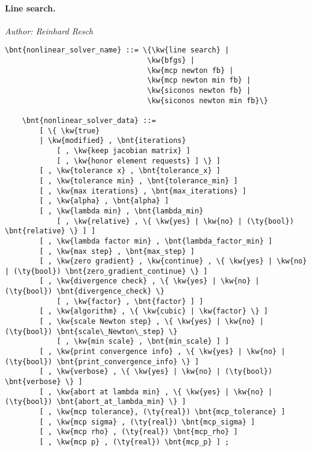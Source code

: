 \paragraph{Line search.}
\emph{Author: Reinhard Resch}
\begin{Verbatim}[commandchars=\\\{\}]
    \bnt{nonlinear_solver_name} ::= \{\kw{line search} |
                                 \kw{bfgs} |
                                 \kw{mcp newton fb} |
                                 \kw{mcp newton min fb} |
                                 \kw{siconos newton fb} |
                                 \kw{siconos newton min fb}\}

    \bnt{nonlinear_solver_data} ::= 
        [ \{ \kw{true}
        | \kw{modified} , \bnt{iterations}
            [ , \kw{keep jacobian matrix} ]
            [ , \kw{honor element requests} ] \} ]
        [ , \kw{tolerance x} , \bnt{tolerance_x} ]
        [ , \kw{tolerance min} , \bnt{tolerance_min} ]
        [ , \kw{max iterations} , \bnt{max_iterations} ]
        [ , \kw{alpha} , \bnt{alpha} ]
        [ , \kw{lambda min} , \bnt{lambda_min}
            [ , \kw{relative} , \{ \kw{yes} | \kw{no} | (\ty{bool}) \bnt{relative} \} ] ]
        [ , \kw{lambda factor min} , \bnt{lambda_factor_min} ]
        [ , \kw{max step} , \bnt{max_step} ]
        [ , \kw{zero gradient} , \kw{continue} , \{ \kw{yes} | \kw{no} | (\ty{bool}) \bnt{zero_gradient_continue} \} ]
        [ , \kw{divergence check} , \{ \kw{yes} | \kw{no} | (\ty{bool}) \bnt{divergence_check} \}
            [ , \kw{factor} , \bnt{factor} ] ]
        [ , \kw{algorithm} , \{ \kw{cubic} | \kw{factor} \} ]
        [ , \kw{scale Newton step} , \{ \kw{yes} | \kw{no} | (\ty{bool}) \bnt{scale\_Newton\_step} \}
            [ , \kw{min scale} , \bnt{min_scale} ] ]
        [ , \kw{print convergence info} , \{ \kw{yes} | \kw{no} | (\ty{bool}) \bnt{print_convergence_info} \} ]
        [ , \kw{verbose} , \{ \kw{yes} | \kw{no} | (\ty{bool}) \bnt{verbose} \} ]
        [ , \kw{abort at lambda min} , \{ \kw{yes} | \kw{no} | (\ty{bool}) \bnt{abort_at_lambda_min} \} ]
        [ , \kw{mcp tolerance}, (\ty{real}) \bnt{mcp_tolerance} ]
        [ , \kw{mcp sigma} , (\ty{real}) \bnt{mcp_sigma} ]
        [ , \kw{mcp rho} , (\ty{real}) \bnt{mcp_rho} ]
        [ , \kw{mcp p} , (\ty{real}) \bnt{mcp_p} ] ;
\end{Verbatim}
